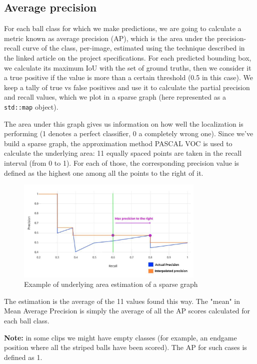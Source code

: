 \subsection{Average precision}

For each ball class for which we make predictions, we are going to 
calculate a metric known as average precision (AP), which is the 
area under the precision-recall curve of the class, per-image, estimated 
using the technique described in the linked article on the project specifications.
For each predicted bounding box, we calculate its maximum IoU with the 
set of ground truths, then we consider it a true positive if the 
value is more than a certain threshold (0.5 in this case). 
We keep a tally of true vs false positives and use it to calculate 
the partial precision and recall values, which we plot in a sparse 
graph (here represented as a \verb|std::map| object).

The area under this graph gives us information on how well the 
localization is performing (1 denotes a perfect classifier, 0 a 
completely wrong one). Since we've build a sparse graph, the 
approximation method PASCAL VOC is used to calculate the 
underlying area: 11 equally spaced points are taken in the 
recall interval (from 0 to 1). For each of those, the corresponding 
precision value is defined as the highest one among all the 
points to the right of it.

\begin{figure}[h]
    \centering
    \includegraphics[width=0.8\textwidth]{./imgs/average_precision_graph.jpg}
    \caption{Example of underlying area estimation of a sparse graph}
\end{figure}

The estimation is the average of the 11 values found this way. The "mean" 
in Mean Average Precision is simply the average of all the AP scores 
calculated for each ball class.

\textbf{Note:} in some clips we might have empty classes (for example, an 
endgame position where all the striped balls have been scored). The 
AP for such cases is defined as 1.